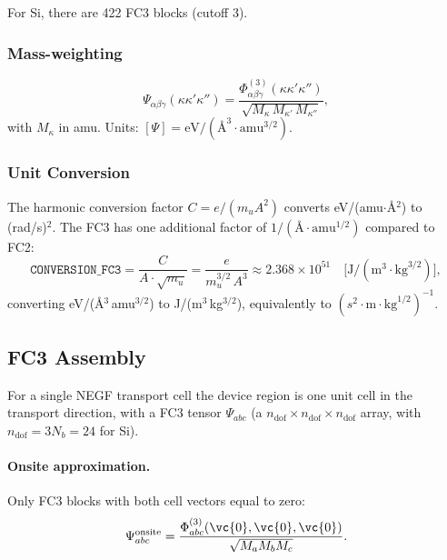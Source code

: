 For Si, there are 422 FC3 blocks (cutoff 3).

\subsubsection{Mass-weighting}

\begin{equation}\label{eq:fc3_mw}
  \Psi_{\alpha\beta\gamma}(\kappa\kappa'\kappa'')
  = \frac{\Phi^{(3)}_{\alpha\beta\gamma}(\kappa\kappa'\kappa'')}
         {\sqrt{M_\kappa\,M_{\kappa'}\,M_{\kappa''}}},
\end{equation}
with $M_\kappa$ in amu.  Units:
$[\Psi] = \mathrm{eV}/(\text{\AA}^3\cdot\mathrm{amu}^{3/2})$.

\subsubsection{Unit Conversion}

The harmonic conversion factor $C = e/(m_u A^2)$ converts
eV/(amu$\cdot$\AA$^2$) to (rad/s)$^2$.  The FC3 has one additional
factor of $1/(\text{\AA}\cdot\mathrm{amu}^{1/2})$ compared to FC2:
\begin{equation}\label{eq:conversion_fc3}
  \texttt{CONVERSION\_FC3}
  = \frac{C}{A\cdot\sqrt{m_u}}
  = \frac{e}{m_u^{3/2}\,A^3}
  \approx 2.368 \times 10^{51}
  \quad\bigl[\mathrm{J}/(\mathrm{m}^3\cdot\mathrm{kg}^{3/2})\bigr],
\end{equation}
converting eV/(\AA$^3$\,amu$^{3/2}$) to
J/(m$^3$\,kg$^{3/2}$), equivalently to
$(s^2\cdot\mathrm{m}\cdot\mathrm{kg}^{1/2})^{-1}$.


\subsection{FC3 Assembly}
\label{sec:assembly_fc3}

For a single NEGF transport cell the device region is one unit cell
in the transport direction, with a FC3 tensor
$\Psi_{abc}$ (a $n_\mathrm{dof}\times n_\mathrm{dof}\times n_\mathrm{dof}$
array, with $n_\mathrm{dof} = 3N_b = 24$ for Si).

\paragraph{Onsite approximation.}
Only FC3 blocks with both cell vectors equal to zero:
\begin{equation}
  \Psi_{abc}^\mathrm{onsite}
  =
    \frac{\Phi^{(3)}_{abc}(\vc{0}, \vc{0}, \vc{0})}
         {\sqrt{M_a M_b M_c}}.
\end{equation}

